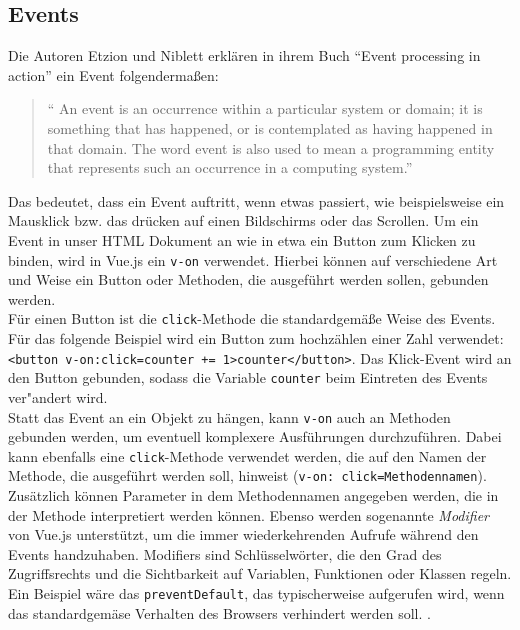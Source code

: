 \subsection*{Events}
Die Autoren Etzion und Niblett erkl\"aren in ihrem Buch \enquote{Event processing in action} ein Event folgenderma\ss{}en:
\begin{quotation}
\enquote{ An event is an occurrence within a particular system or domain; it is
something that has happened, or is contemplated as having happened in that
domain. The word event is also used to mean a programming entity that represents such an occurrence in a computing system\cite{Etzion&Niblett2011}.}
\end{quotation}
Das bedeutet, dass ein Event auftritt, wenn etwas passiert, wie beispielsweise ein Mausklick bzw. das dr\"ucken auf einen Bildschirms oder das Scrollen.
Um ein Event in unser \ac{HTML} Dokument an  wie in etwa ein Button zum Klicken zu binden, wird in Vue.js ein \texttt{v-on} verwendet. Hierbei k\"onnen auf verschiedene Art und Weise ein Button oder Methoden, die ausgef\"uhrt werden sollen, gebunden werden.\\
F\"ur einen Button ist die \texttt{click}-Methode die standardgem\"a\ss{}e Weise des Events. F\"ur das folgende Beispiel wird ein Button zum hochz\"ahlen einer Zahl verwendet: \texttt{<button v-on:click=\grqq counter += 1\grqq>{{counter}}</button>}\cite{VueDokumentationEvent2018}. Das Klick-Event wird an den Button gebunden, sodass die Variable \texttt{counter} beim Eintreten des Events ver"andert wird.\\
Statt das Event an ein Objekt zu h\"angen, kann \texttt{v-on} auch an Methoden gebunden werden, um eventuell komplexere Ausf\"uhrungen durchzuf\"uhren. Dabei  kann ebenfalls eine \texttt{click}-Methode verwendet werden, die auf den Namen der Methode, die ausgef\"uhrt werden soll, hinweist (\texttt{v-on: click=\grqq Methodennamen\grqq})\cite{VueDokumentationEvent2018}. Zus\"atzlich k\"onnen Parameter in dem Methodennamen angegeben werden, die in der Methode interpretiert werden k\"onnen. 
Ebenso werden sogenannte \textit{Modifier} von Vue.js unterst\"utzt, um die immer wiederkehrenden Aufrufe w\"ahrend den Events handzuhaben.
Modifiers sind Schl\"usselw\"orter, die den Grad des Zugriffsrechts und die Sichtbarkeit auf Variablen, Funktionen oder Klassen regeln.
Ein Beispiel w\"are das \texttt{preventDefault}, das typischerweise aufgerufen wird, wenn das standardgem\"ase Verhalten des Browsers verhindert werden soll. 
\cite{VueDokumentationEvent2018}.

